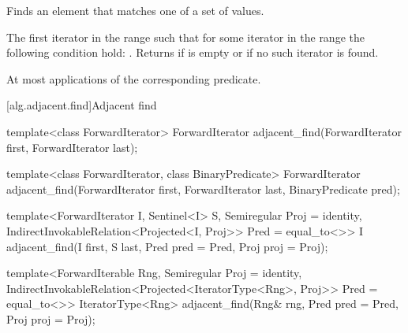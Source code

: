 \begin{itemdescr}
\pnum
\effects
Finds an element that matches one of a set of values.

\pnum
\returns
The first iterator
in the range 
such that for some
iterator
in the range 
the following condition hold:
.
Returns 
if  is empty or if
no such iterator is found.

\pnum
\complexity
At most
applications of the corresponding predicate.
\end{itemdescr}

[alg.adjacent.find]{Adjacent find}

%
\begin{removedblock}
\begin{itemdecl}
template<class ForwardIterator>
  ForwardIterator adjacent_find(ForwardIterator first, ForwardIterator last);

template<class ForwardIterator, class BinaryPredicate>
  ForwardIterator adjacent_find(ForwardIterator first, ForwardIterator last,
                              BinaryPredicate pred);
\end{itemdecl}
\end{removedblock}
\begin{addedblock}
\begin{itemdecl}
template<ForwardIterator I, Sentinel<I> S, Semiregular Proj = identity,
    IndirectInvokableRelation<Projected<I, Proj>> Pred = equal_to<>>
  I
    adjacent_find(I first, S last, Pred pred = Pred{},
                  Proj proj = Proj{});

template<ForwardIterable Rng, Semiregular Proj = identity,
    IndirectInvokableRelation<Projected<IteratorType<Rng>, Proj>> Pred = equal_to<>>
  IteratorType<Rng>
    adjacent_find(Rng& rng, Pred pred = Pred{}, Proj proj = Proj{});
\end{itemdecl}
\end{addedblock}

